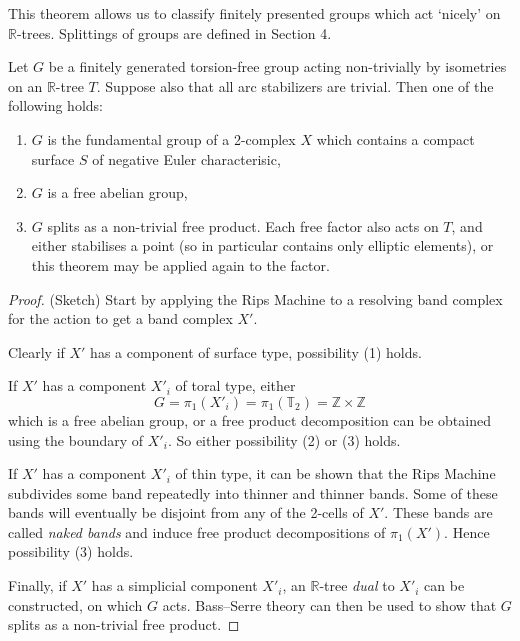 This theorem allows us to classify finitely presented groups which act `nicely' on $\mathbb{R}$-trees. Splittings of groups are defined in Section 4.
\begin{theorem}\label{rtreesclassification}
    Let $G$ be a finitely generated torsion-free group acting non-trivially by isometries on an $\mathbb{R}$-tree $T$. Suppose also that all arc stabilizers are trivial. Then one of the following holds:
    \begin{enumerate}
        \item $G$ is the fundamental group of a 2-complex $X$ which contains a compact surface $S$ of negative Euler characterisic,
        \item $G$ is a free abelian group,
        \item $G$ splits as a non-trivial free product. Each free factor also acts on $T$, and either stabilises a point (so in particular contains only elliptic elements), or this theorem may be applied again to the factor.
    \end{enumerate}
\end{theorem}
\begin{proof} (Sketch)
    Start by applying the Rips Machine to a resolving band complex for the action to get a band complex $X'$. 

    Clearly if $X'$ has a component of surface type, possibility (1) holds.

    If $X'$ has a component $X'_i$ of toral type, either \[G=\pi_1(X'_i)=\pi_1(\mathbb{T}_2)=\mathbb{Z}\times\mathbb{Z}\] which is a free abelian group, or a free product decomposition can be obtained using the boundary of $X'_i$. So either possibility (2) or (3) holds. 

    If $X'$ has a component $X'_i$ of thin type, it can be shown that the Rips Machine subdivides some band repeatedly into thinner and thinner bands. Some of these bands will eventually be disjoint from any of the 2-cells of $X'$. These bands are called \textit{naked bands} and induce free product decompositions of $\pi_1(X')$. %
    Hence possibility (3) holds.

    Finally, if $X'$ has a simplicial component $X'_i$, an $\mathbb{R}$-tree \textit{dual} to $X'_i$ can be constructed, on which $G$ acts. Bass--Serre theory can then be used to show that $G$ splits as a non-trivial free product.
\end{proof}


